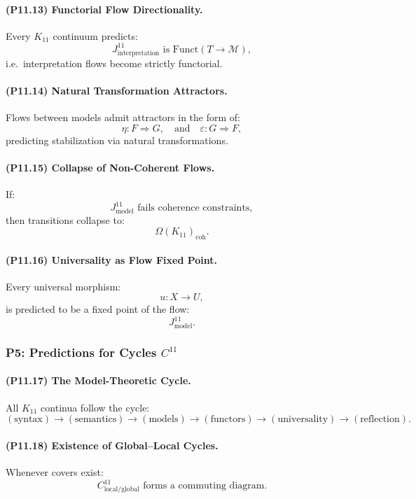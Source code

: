 \paragraph{(P11.13) Functorial Flow Directionality.}
Every $K_{11}$ continuum predicts:
\[
J_{\mathrm{interpretation}}^{11}
\text{ is } \mathrm{Funct}(T \to \mathcal{M}),
\]
i.e.\ interpretation flows become strictly functorial.

\paragraph{(P11.14) Natural Transformation Attractors.}
Flows between models admit attractors in the form of:
\[
\eta: F \Rightarrow G,
\quad\text{and}\quad
\varepsilon: G \Rightarrow F,
\]
predicting stabilization via natural transformations.

\paragraph{(P11.15) Collapse of Non-Coherent Flows.}
If:
\[
J_{\mathrm{model}}^{11}
\text{ fails coherence constraints},
\]
then transitions collapse to:
\[
\Omega(K_{11})_{\mathrm{coh}}.
\]

\paragraph{(P11.16) Universality as Flow Fixed Point.}
Every universal morphism:
\[
u: X \to U,
\]
is predicted to be a fixed point of the flow:
\[
J_{\mathrm{model}}^{11}.
\]

\subsubsection{P5: Predictions for Cycles $C^{11}$}

\paragraph{(P11.17) The Model-Theoretic Cycle.}
All $K_{11}$ continua follow the cycle:
\[
(\text{syntax}) \to (\text{semantics}) 
\to (\text{models}) \to (\text{functors})
\to (\text{universality}) \to (\text{reflection}).
\]

\paragraph{(P11.18) Existence of Global–Local Cycles.}
Whenever covers exist:
\[
C_{\mathrm{local/global}}^{11}
\text{ forms a commuting diagram.}
\]

